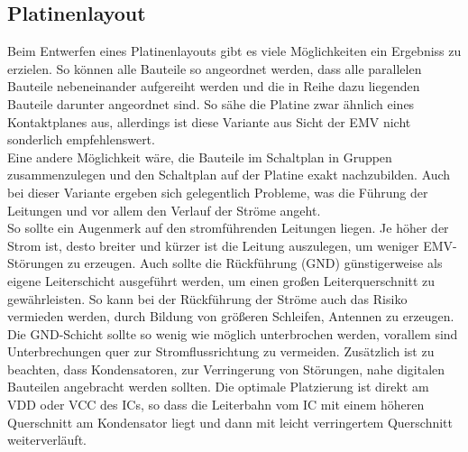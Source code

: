 \subsection{Platinenlayout}
Beim Entwerfen eines Platinenlayouts gibt es viele Möglichkeiten ein Ergebniss zu erzielen. So können alle Bauteile so angeordnet werden, dass alle parallelen Bauteile nebeneinander aufgereiht werden und die in Reihe dazu liegenden Bauteile darunter angeordnet sind. So sähe die Platine zwar ähnlich eines Kontaktplanes aus, allerdings ist diese Variante aus Sicht der EMV nicht sonderlich empfehlenswert.\\
Eine andere Möglichkeit wäre, die Bauteile im Schaltplan in Gruppen zusammenzulegen und den Schaltplan auf der Platine exakt nachzubilden. Auch bei dieser Variante ergeben sich gelegentlich Probleme, was die Führung der Leitungen und vor allem den Verlauf der Ströme angeht.\\
So sollte ein Augenmerk auf den stromführenden Leitungen liegen. Je höher der Strom ist, desto breiter und kürzer ist die Leitung auszulegen, um weniger EMV-Störungen zu erzeugen. Auch sollte die Rückführung (GND) günstigerweise als eigene Leiterschicht ausgeführt werden, um einen großen Leiterquerschnitt zu gewährleisten. So kann bei der Rückführung der Ströme auch das Risiko vermieden werden, durch Bildung von größeren Schleifen, Antennen zu erzeugen. Die GND-Schicht sollte so wenig wie möglich unterbrochen werden, vorallem sind Unterbrechungen quer zur Stromflussrichtung zu vermeiden. Zusätzlich ist zu beachten, dass Kondensatoren, zur Verringerung von Störungen, nahe digitalen Bauteilen angebracht werden sollten. Die optimale Platzierung ist direkt am VDD oder VCC des ICs, so dass die Leiterbahn vom IC mit einem höheren Querschnitt am Kondensator liegt und dann mit leicht verringertem Querschnitt weiterverläuft.


